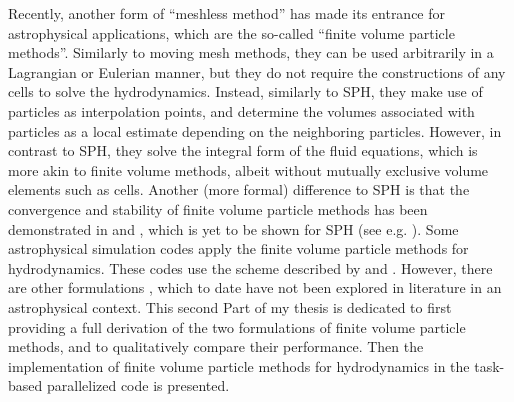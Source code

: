 Recently, another form of ``meshless method'' has made its entrance for astrophysical applications,
which are the so-called ``finite volume particle methods''. Similarly to moving mesh methods, they
can be used arbitrarily in a Lagrangian or Eulerian manner, but they do not require the
constructions of any cells to solve the hydrodynamics. Instead, similarly to SPH, they make use of
particles as interpolation points, and determine the volumes associated with particles as a local
estimate depending on the neighboring particles. However, in contrast to SPH, they solve the
integral form of the fluid equations, which is more akin to finite volume methods, albeit without
mutually exclusive volume elements such as cells. Another (more formal) difference to SPH is that
the convergence and stability of finite volume particle methods has been demonstrated in
\cite{lansonRenormalizedMeshfreeSchemes2008} and \cite{lansonRenormalizedMeshfreeSchemes2008a},
which is yet to be shown for SPH (see e.g. \cite{vacondioGrandChallengesSmoothed2021}). Some
astrophysical simulation codes \citep[e.g.][]{gaburovAstrophysicalWeightedParticle2011,
hopkinsGIZMONewClass2015, hubberGANDALFGraphicalAstrophysics2018,
grothCosmologicalSimulationCode2023a, alonsoasensioMeshfreeHydrodynamicsPKDGRAV32023} apply the
finite volume particle methods for hydrodynamics. These codes use the scheme described by
\cite{lansonRenormalizedMeshfreeSchemes2008} and \cite{lansonRenormalizedMeshfreeSchemes2008a}.
However, there are other formulations \citep[e.g.][]{hietelFiniteVolumeParticleMethodConservation2001,
hietelMeshlessMethodsConservation2005, ivanovaCommonEnvelopeEvolution2013}, which to date have not been explored in literature in an astrophysical context. This second Part of my thesis is dedicated to first providing a full derivation of the two formulations of finite volume particle methods, and to qualitatively compare their performance. Then the implementation of finite volume particle methods for hydrodynamics in the task-based parallelized code \swift \cite{gonnetSWIFTFastAlgorithms2013} is presented.
















